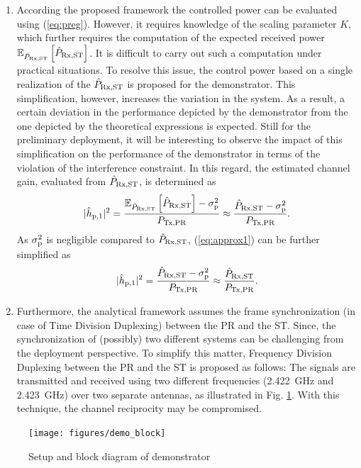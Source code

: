 \begin{enumerate}
	\item According the proposed framework the controlled power can be evaluated using (\ref{eq:preg}). However, it requires knowledge of the scaling parameter $K$, which further requires the computation of the expected received power ${\mathbb E}_{\hat{P}_{\text{Rx,ST}}}\left[ \hat{P}_{\text{Rx,ST}} \right]$. It is difficult to carry out such a computation under practical situations. To resolve this issue, the control power based on a single realization of the $\hat{P}_{\text{Rx,ST}}$ is proposed for the demonstrator. This simplification, however, increases the variation in the system. As a result, a certain deviation in the performance depicted by the demonstrator from the one depicted by the theoretical expressions is expected. Still for the preliminary deployment, it will be interesting to observe the impact of this simplification on the performance of the demonstrator in terms of the violation of the interference constraint. In this regard, the estimated channel gain, evaluated from $\hat{P}_{\text{Rx,ST}}$, is determined as 
	\begin{equation}
		|\hat{h}_{\text{p,1}}|^2 = \frac{{\mathbb E}_{\hat{P}_{\text{Rx,ST}}}\left[ \hat{P}_{\text{Rx,ST}} \right]-\sigma^2_{\text{p}}}{P_{\text{Tx,PR}}} \approx \frac{\hat{P}_{\text{Rx,ST}}-\sigma^2_{\text{p}}}{P_{\text{Tx,PR}}}. 
		\label{eq:approx1}
	\end{equation}	
As $\sigma^2_{\text{p}}$ is negligible compared to $\hat{P}_{\text{Rx,ST}}$, (\ref{eq:approx1}) can be further simplified as 
	\begin{equation}
		|\hat{h}_{\text{p,1}}|^2 = \frac{\hat{P}_{\text{Rx,ST}}-\sigma^2_{\text{p}}}{P_{\text{Tx,PR}}} \approx \frac{\hat{P}_{\text{Rx,ST}}}{P_{\text{Tx,PR}}}.
		\label{eq:approx2}
	\end{equation}	
	\item Furthermore, the analytical framework assumes the frame synchronization (in case of Time Division Duplexing) between the PR and the ST. Since, the synchronization of (possibly) two different systems can be challenging from the deployment perspective. To simplify this matter, Frequency Division Duplexing between the PR and the ST is proposed as follows: The signals are transmitted and received using two different frequencies (\SI{2.422}{GHz} and \SI{2.423}{GHz}) over two separate antennas, as illustrated in Fig. \ref{demo_blockA}. With this technique, the channel reciprocity may be compromised.	
\end{enumerate}

\begin{figure}
	\centering
	\texttt{[image: figures/demo\_block]}
	\caption{Setup and block diagram of demonstrator}
	\label{demo_blockA}
\end{figure}

